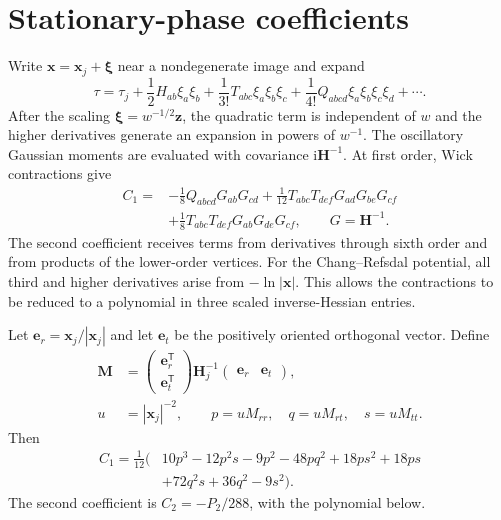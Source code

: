 \documentclass[aps,prd,twocolumn,nofootinbib,superscriptaddress,floatfix]{revtex4-2}
\newcommand{\ii}{\mathrm{i}}
\newcommand{\bx}{\bm{x}}
\newcommand{\bH}{\bm{H}}
\begin{document}
\section{Stationary-phase coefficients}
\label{app:stationary-coefficients}

Write $\bx=\bx_j+\bm\xi$ near a nondegenerate image and expand
\begin{equation}
 \tau=\tau_j+\frac12H_{ab}\xi_a\xi_b
 +\frac1{3!}T_{abc}\xi_a\xi_b\xi_c
 +\frac1{4!}Q_{abcd}\xi_a\xi_b\xi_c\xi_d+\cdots.
 \label{eq:local-taylor}
\end{equation}
After the scaling $\bm\xi=w^{-1/2}\bm z$, the quadratic term is independent of
$w$ and the higher derivatives generate an expansion in powers of $w^{-1}$.
The oscillatory Gaussian moments are evaluated with covariance
$\ii\bH^{-1}$.  At first order, Wick contractions give
\begin{align}
 C_1={}&-\frac18 Q_{abcd}G_{ab}G_{cd}
 +\frac1{12}T_{abc}T_{def}G_{ad}G_{be}G_{cf}\nonumber\\
 &+\frac18T_{abc}T_{def}G_{ab}G_{de}G_{cf},
 \qquad G=\bH^{-1}.
 \label{eq:C1-contraction}
\end{align}
The second coefficient receives terms from derivatives through sixth order and
from products of the lower-order vertices.  For the Chang--Refsdal potential,
all third and higher derivatives arise from $-\ln|\bx|$.  This allows the
contractions to be reduced to a polynomial in three scaled inverse-Hessian
entries.

Let $\bm e_r=\bx_j/|\bx_j|$ and let $\bm e_t$ be the positively oriented
orthogonal vector.  Define
\begin{align}
 \bm M&=
 \begin{pmatrix}\bm e_r^{\mathsf T}\\\bm e_t^{\mathsf T}\end{pmatrix}
 \bH_j^{-1}
 \begin{pmatrix}\bm e_r&\bm e_t\end{pmatrix},
 \label{eq:M-def}\\
 u&=|\bx_j|^{-2},
 \qquad
 p=uM_{rr},\quad q=uM_{rt},\quad s=uM_{tt}.
 \label{eq:pqs}
\end{align}
Then
\begin{align}
C_1=\frac{1}{12}\big(&10p^3-12p^2s-9p^2-48pq^2+18ps^2+18ps\nonumber\\
&+72q^2s+36q^2-9s^2\big).
 \label{eq:C1-explicit}
\end{align}
The second coefficient is $C_2=-P_2/288$, with the polynomial below.
\end{document}
